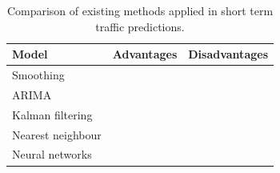 \begin{table}
\centering
    \begin{tabular}{ l p{5cm} p{5cm}} \hline
       \textbf{Model} & Advantages & Disadvantages\\ \hline
       Smoothing &   &  \\ \hline
       ARIMA &    &  \\ \hline
       Kalman filtering &   &  \\ \hline
       Nearest neighbour &   &  \\ \hline
       Neural networks &  &  \\ \hline
    \end{tabular}
    \caption[Comparison of existing methods]{Comparison of existing methods applied in short term
     traffic predictions.}
    \label{table:comparisonExistingMethods}
\end{table}